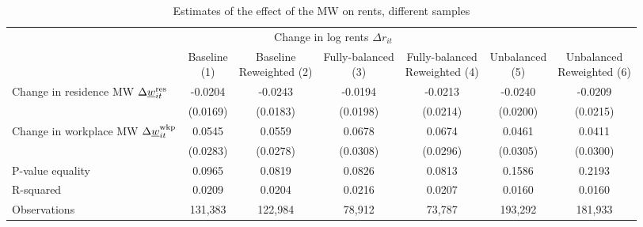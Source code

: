 \begin{landscape}
\begin{table}[hbt!]
    \centering
    \caption{Estimates of the effect of the MW on rents, different samples}
    \label{tab:static_sample}

    \begin{tabular}{@{}lcccccc@{}}
        \toprule
                                             & \multicolumn{4}{c}{Change in log rents $\Delta r_{it}$}                   \\ \cmidrule(l){2-7} 
                                             & \shortstack{Baseline\\(1)}       & \shortstack{Baseline\\Reweighted (2)}
                                             & \shortstack{Fully-balanced\\(3)} & \shortstack{Fully-balanced\\Reweighted (4)}  
                                             & \shortstack{Unbalanced\\(5)}     & \shortstack{Unbalanced\\Reweighted (6)}  \\ \midrule
        Change in residence MW 
                  $\Delta\underline{w}_{it}^{\text{res}}$    & -0.0204      & -0.0243        & -0.0194       & -0.0213    & -0.0240       & -0.0209     \\
                                             & (0.0169)    & (0.0183)      & (0.0198)     & (0.0214)  & (0.0200)     & (0.0215)   \\
        Change in workplace MW 
                   $\Delta\underline{w}_{it}^{\text{wkp}}$   & 0.0545      & 0.0559        & 0.0678       & 0.0674    & 0.0461       & 0.0411     \\
                                             & (0.0283)    & (0.0278)      & (0.0308)     & (0.0296)  & (0.0305)     & (0.0300)   \\ \midrule
        P-value equality                     & 0.0965      & 0.0819        & 0.0826       & 0.0813    & 0.1586       & 0.2193     \\
        R-squared                            & 0.0209      & 0.0204        & 0.0216       & 0.0207    & 0.0160       & 0.0160     \\
        Observations                         & 131,383     & 122,984       & 78,912      & 73,787   & 193,292      & 181,933    \\ \bottomrule
    \end{tabular}


\end{table}
\end{landscape}
